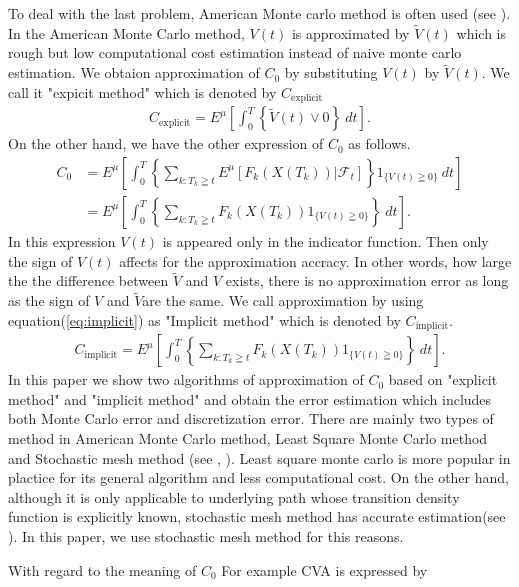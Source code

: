 \documentclass[12pt]{article}
\begin{document}
To deal with the last problem, American Monte carlo method is often used (see \cite{G}).
In the American Monte Carlo method, $V(t)$ is approximated by $\tilde{V}(t)$ which is rough but low computational cost estimation instead of naive monte carlo estimation.
We obtaion approximation of $C_0$ by substituting $V(t)$ by $\tilde{V}(t)$.
We call it "expicit method" which is denoted by $C_{\text{explicit}}$
\begin{align}
C_{\text{explicit}}=E^{\mu}\left[\int_{0}^T \left\{\tilde{V}(t) \vee0 \right \} \ dt \right].
\end{align}
On the other hand, we have the other expression of $C_0$ as follows.
\begin{align}\label{eq:implicit}
  C_0 &= E^{\mu}\left[\int_{0}^T \left\{ \sum_{k:T_k\geqq t} E^{\mu} \left[ F_k({X}(T_k)) |\mathcal{F}_t \right]\right \} 1_{\{V(t) \geqq 0\}}\ dt \right]\nonumber \\
      &=E^{\mu}\left[\int_{0}^T \left\{ \sum_{k:T_k\geqq t} F_k({X}(T_k)) 1_{\{V(t) \geqq 0\}}\right \} \ dt \right].
\end{align}
In this expression $V(t)$ is appeared only in the indicator function. Then only the sign of
$V(t)$ affects for the approximation accracy. In other words, how large the the difference between
$\tilde{V}$ and $V$ exists, there is no approximation error as long as the sign of $V$ and $\tilde{V}$are the same.
We call approximation by using equation(\ref{eq:implicit}) as "Implicit method" which is denoted by $C_{\text{implicit}}$.
\begin{align}
   C_{\text{implicit}}=E^{\mu}\left[\int_{0}^T \left\{ \sum_{k:T_k\geqq t} F_k({X}(T_k)) 1_{\{V(t) \geqq 0\}}\right \} \ dt \right].
\end{align}
In this paper we show two algorithms of approximation of $C_0$ based on "explicit method" and 
"implicit method" and obtain the error estimation which includes both Monte Carlo error and
discretization error.
There are mainly two types of method in American Monte Carlo method, Least Square Monte Carlo method and Stochastic mesh method (see \cite{G}, \cite{BG1}).
Least square monte carlo is more popular in plactice for its general algorithm and
less computational cost.
On the other hand, although it is only applicable to underlying path whose transition density function is  explicitly known, stochastic mesh method has accurate estimation(see \cite{KM}).
In this paper, we use stochastic mesh method for this reasons.

With regard to the meaning of $C_0$
For example CVA is expressed by 
\end{document}
